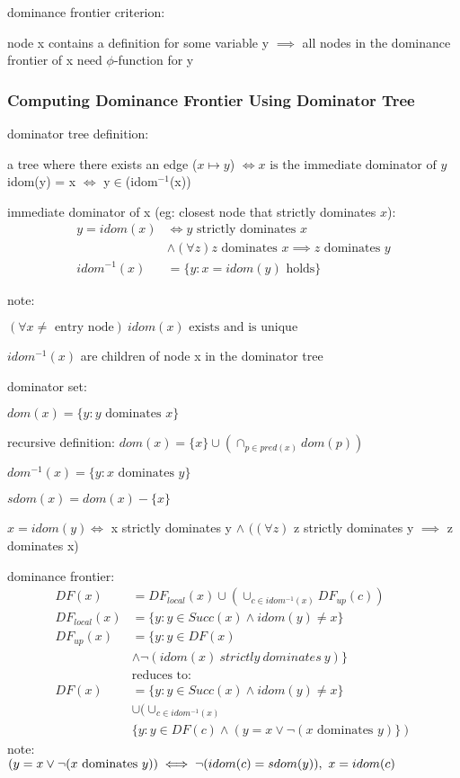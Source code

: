 \documentclass[8pt]{extarticle}
\begin{document}
\begin{multicols*}{2}
  dominance frontier criterion:
  
  node x contains a definition for some variable y $\implies$ all nodes in the dominance frontier of x need $\phi$-function for y

  \subsubsection{Computing Dominance Frontier Using Dominator Tree}

  dominator tree definition:

  a tree where there exists an edge ($x \mapsto y$) $\iff x \text{ is the immediate dominator of } y$\\
  idom(y) = x $\iff$ y$\in$(idom$^{-1}$(x))

immediate dominator of x (eg: closest node that strictly dominates $x$):
\begin{align*}
  y = idom(x) & \iff y \text{ strictly dominates } x\\
              & \wedge (\forall z) z \text{ dominates } x \implies z \text{ dominates } y\\
  idom^{-1}(x) & = \{y: x=idom(y) \text{ holds}\}
\end{align*}

note:

$(\forall x \neq \text{ entry node})\ idom(x) \text{ exists and is unique}$

$idom^{-1}(x)$ are children of node x in the dominator tree

dominator set:

$dom(x)=\{y: y \text{ dominates } x\}$

recursive definition:
$dom(x) = \{x\} \cup (\cap_{p \in pred(x)} dom(p))$
  
$dom^{-1}(x) = \{y: x \text{ dominates } y\}$

$sdom(x) = dom(x) - \{x\}$

$x=idom(y) \iff$ x strictly dominates y $\wedge$ $((\forall z)$ z strictly dominates y $\implies$ z dominates x)

dominance frontier:
\begin{align*}
  DF(x) &= DF_{local}(x) \cup (\cup_{c \in idom^{-1}(x)} DF_{up}(c))\\
  DF_{local}(x) &= \{y: y \in Succ(x) \wedge idom(y) \neq x\}\\
  DF_{up}(x) &= \{y: y \in DF(x)\\
        & \wedge \neg(idom(x)\ strictly\ dominates\ y) \}\\
  &\text{reduces to:}\\
  DF(x) &= \{y: y \in Succ(x) \wedge idom(y) \neq x\}\\
        &\cup (\cup_{c \in idom^{-1}(x)}\\
        &\{y: y \in DF(c) \wedge (y=x \vee \neg(x \text{ dominates } y)\})
\end{align*}
note:\\
$(y=x \vee \neg(x \text{ dominates } y))\\ \iff \neg (idom(c) = sdom(y)),\ x=idom(c)$


\end{multicols*}
\end{document}

